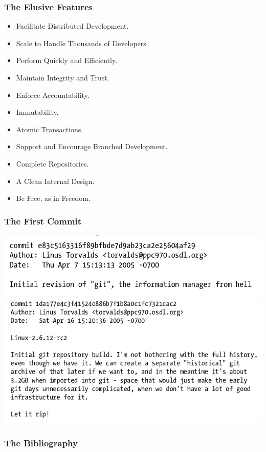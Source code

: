 \documentclass[22pt]{beamer}
\begin{document}
\begin{frame}
    \frametitle{The Elusive Features}
    \begin{itemize}
        \item Facilitate Distributed Development.
              \pause
        \item Scale to Handle Thousands of Developers.
              \pause
        \item Perform Quickly and Efficiently.
              \pause
        \item Maintain Integrity and Trust.
              \pause
        \item Enforce Accountability.
              \pause
        \item Immutability.
              \pause
        \item Atomic Transactions.
              \pause
        \item Support and Encourage Branched Development.
              \pause
        \item Complete Repositories.
              \pause
        \item A Clean Internal Design.
              \pause
        \item Be Free, as in Freedom.
    \end{itemize}



\end{frame}


\begin{frame}[allowframebreaks]
    \frametitle{The First Commit}

    \includegraphics[width=\linewidth]{images/Screenshot from 2020-12-10 13-43-08.png}
    \includegraphics[width=\linewidth]{images/Screenshot from 2020-12-10 13-35-57.png}


\end{frame}

\begin{frame}
    \frametitle{The Bibliography}


    

\end{frame}
\end{document}
